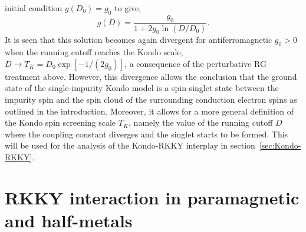 \documentclass[12pt,twoside]{article}
\begin{document}
initial condition $g(D_0)=g_0$ to give,  
\begin{equation}
g(D) = \frac{g_0}{1+2g_0\ln (D/D_0)}.
\end{equation}
It is seen that this solution becomes again divergent for 
antiferromagnetic $g_0>0$ when the running 
cutoff reaches the Kondo scale, $D\to T_K=D_0\exp\left[-1/(2g_0)\right]$,
a consequence of the perturbative RG treatment above. However, this 
divergence allows the conclusion that the ground state of the 
single-impurity Kondo model is a spin-singlet state between the impurity spin
and the spin cloud of the surrounding conduction electron spins as 
outlined in the introduction. Moreover, it allows for a more general 
definition of the Kondo spin screening scale $T_K$, namely the value
of the running cutoff $D$ where the coupling constant diverges and the 
singlet starts to be formed. This will be used for the analysis of the 
Kondo-RKKY interplay in section~\ref{sec:Kondo-RKKY}.




\section{RKKY interaction in paramagnetic and half-metals}
\label{sec:RKKY}
\end{document}
